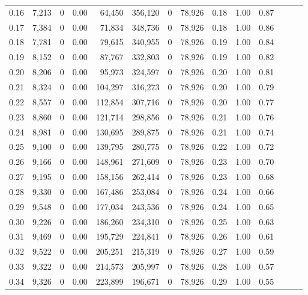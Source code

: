 \begin{tabular}{rrrrrrrrrrrrrr}
0.16 &  7,213 &      0 &  0.00 &   64,450 &  356,120 &       0 &  78,926 &  0.18 &  1.00 &      0.87 \\
0.17 &  7,384 &      0 &  0.00 &   71,834 &  348,736 &       0 &  78,926 &  0.18 &  1.00 &      0.86 \\
0.18 &  7,781 &      0 &  0.00 &   79,615 &  340,955 &       0 &  78,926 &  0.19 &  1.00 &      0.84 \\
0.19 &  8,152 &      0 &  0.00 &   87,767 &  332,803 &       0 &  78,926 &  0.19 &  1.00 &      0.82 \\
0.20 &  8,206 &      0 &  0.00 &   95,973 &  324,597 &       0 &  78,926 &  0.20 &  1.00 &      0.81 \\
0.21 &  8,324 &      0 &  0.00 &  104,297 &  316,273 &       0 &  78,926 &  0.20 &  1.00 &      0.79 \\
0.22 &  8,557 &      0 &  0.00 &  112,854 &  307,716 &       0 &  78,926 &  0.20 &  1.00 &      0.77 \\
0.23 &  8,860 &      0 &  0.00 &  121,714 &  298,856 &       0 &  78,926 &  0.21 &  1.00 &      0.76 \\
0.24 &  8,981 &      0 &  0.00 &  130,695 &  289,875 &       0 &  78,926 &  0.21 &  1.00 &      0.74 \\
0.25 &  9,100 &      0 &  0.00 &  139,795 &  280,775 &       0 &  78,926 &  0.22 &  1.00 &      0.72 \\
0.26 &  9,166 &      0 &  0.00 &  148,961 &  271,609 &       0 &  78,926 &  0.23 &  1.00 &      0.70 \\
0.27 &  9,195 &      0 &  0.00 &  158,156 &  262,414 &       0 &  78,926 &  0.23 &  1.00 &      0.68 \\
0.28 &  9,330 &      0 &  0.00 &  167,486 &  253,084 &       0 &  78,926 &  0.24 &  1.00 &      0.66 \\
0.29 &  9,548 &      0 &  0.00 &  177,034 &  243,536 &       0 &  78,926 &  0.24 &  1.00 &      0.65 \\
0.30 &  9,226 &      0 &  0.00 &  186,260 &  234,310 &       0 &  78,926 &  0.25 &  1.00 &      0.63 \\
0.31 &  9,469 &      0 &  0.00 &  195,729 &  224,841 &       0 &  78,926 &  0.26 &  1.00 &      0.61 \\
0.32 &  9,522 &      0 &  0.00 &  205,251 &  215,319 &       0 &  78,926 &  0.27 &  1.00 &      0.59 \\
0.33 &  9,322 &      0 &  0.00 &  214,573 &  205,997 &       0 &  78,926 &  0.28 &  1.00 &      0.57 \\
0.34 &  9,326 &      0 &  0.00 &  223,899 &  196,671 &       0 &  78,926 &  0.29 &  1.00 &      0.55 \\

\end{tabular}
